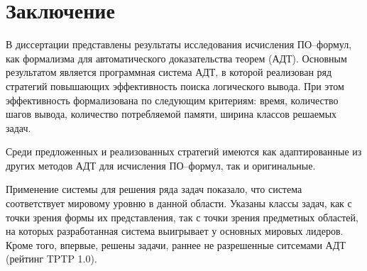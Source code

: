 \chapter*{Заключение}

В диссертации представлены результаты исследования исчисления ПО--формул, как формализма для автоматического доказательства теорем (АДТ). Основным результатом является программная система АДТ, в которой реализован ряд стратегий повышающих эффективность поиска логического вывода. При этом эффективность формализована по следующим критериям: время, количество шагов вывода, количество потребляемой памяти, ширина классов решаемых задач.

Среди предложенных и реализованных стратегий имеются как адаптированные из других методов АДТ для исчисления ПО--формул, так и оригинальные.

Применение системы для решения ряда задач показало, что система соответствует мировому уровню в данной области. Указаны классы задач, как с точки зрения формы их представления, так с точки зрения предметных областей, на которых разработанная система выигрывает у основных мировых лидеров. Кроме того, впервые, решены задачи, раннее не разрешенные ситсемами АДТ (рейтинг TPTP 1.0).



